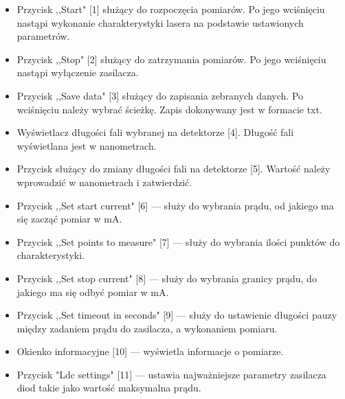 \begin{itemize}
\item Przycisk ,,Start" [1] służący do rozpoczęcia pomiarów. Po jego wciśnięciu nastąpi wykonanie charakterystyki lasera na podstawie ustawionych parametrów.
\item Przycisk ,,Stop" [2] służący do zatrzymania pomiarów. Po jego wciśnięciu nastąpi wyłączenie zasilacza.
\item Przycisk ,,Save data" [3] służący do zapisania zebranych danych. Po wciśnięciu należy wybrać ścieżkę. Zapis dokonywany jest w formacie txt.
\item Wyświetlacz długości fali wybranej na detektorze [4]. Długość fali wyświetlana jest w nanometrach.
\item Przycisk służący do zmiany długości fali na detektorze [5]. Wartość należy wprowadzić w nanometrach i zatwierdzić.
\item Przycisk ,,Set start current" [6] --- służy do wybrania prądu, od jakiego ma się zacząć pomiar w mA.
\item Przycisk ,,Set points to measure" [7] --- służy do wybrania ilości punktów do charakterystyki.
\item Przycisk ,,Set stop current" [8] --- służy do wybrania granicy prądu, do jakiego ma się odbyć pomiar w mA.
\item Przycisk ,,Set timeout in seconds" [9] --- służy do ustawienie długości pauzy między zadaniem prądu do zasilacza, a wykonaniem pomiaru.
\item Okienko informacyjne [10] --- wyświetla informacje o pomiarze.
\item Przycisk "Ldc settings" [11] --- ustawia najważniejsze parametry zasilacza diod takie jako wartość maksymalna prądu.
\end{itemize}